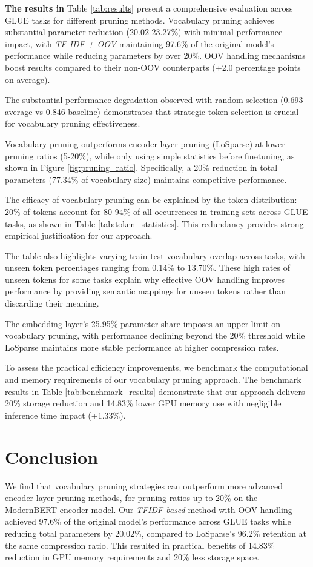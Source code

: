 \documentclass[twocolumn]{article}
\begin{document}
\textbf{The results in}
Table \ref{tab:results} present a comprehensive evaluation across GLUE tasks for different pruning methods. 
% 
Vocabulary pruning achieves substantial parameter reduction (20.02-23.27\%) with minimal performance impact, with \textit{TF-IDF + OOV} maintaining 97.6\% of the original model's performance while reducing parameters by over 20\%. OOV handling mechanisms boost results compared to their non-OOV counterparts (+2.0 percentage points on average). 

The substantial performance degradation observed with random selection (0.693 average vs 0.846 baseline) demonstrates that strategic token selection is crucial for vocabulary pruning effectiveness.

Vocabulary pruning outperforms encoder-layer pruning (LoSparse) at lower pruning ratios (5-20\%), while only using simple statistics before finetuning, as shown in Figure \ref{fig:pruning_ratio}.
Specifically, a 20\% reduction in total parameters (77.34\% of vocabulary size) maintains competitive performance.


The efficacy of vocabulary pruning can be explained by the token-distribution: 20\% of tokens account for 80-94\% of all occurrences in training sets across GLUE tasks, as shown in Table \ref{tab:token_statistics}. This redundancy provides strong empirical justification for our approach. 

The table also highlights varying train-test vocabulary overlap across tasks, with unseen token percentages ranging from 0.14\% to 13.70\%. These high rates of unseen tokens for some tasks explain why effective OOV handling improves performance by providing semantic mappings for unseen tokens rather than discarding their meaning.


The embedding layer's 25.95\% parameter share imposes an upper limit on vocabulary pruning, with performance declining beyond the 20\% threshold while LoSparse maintains more stable performance at higher compression rates. 

To assess the practical efficiency improvements, we benchmark the computational and memory requirements of our vocabulary pruning approach. The benchmark results in Table \ref{tab:benchmark_results} demonstrate that our approach delivers 20\% storage reduction and 14.83\% lower GPU memory use with negligible inference time impact (+1.33\%).



\section{Conclusion}
We find that vocabulary pruning strategies can outperform more advanced encoder-layer pruning methods, for pruning ratios up to 20\% on the ModernBERT encoder model.
Our \textit{TFIDF-based} method with OOV handling achieved 97.6\% of the original model's performance across GLUE tasks while reducing total parameters by 20.02\%, compared to LoSparse's 96.2\% retention at the same compression ratio. This resulted in practical benefits of 14.83\% reduction in GPU memory requirements and 20\% less storage space.
\end{document}
